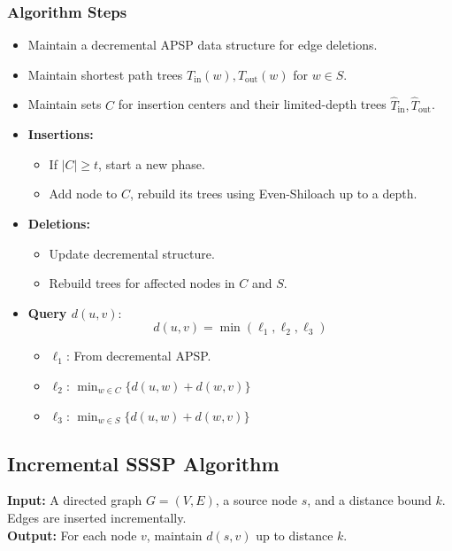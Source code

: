\documentclass[11pt]{article}
\begin{document}
\subsubsection*{Algorithm Steps}
\begin{itemize}
    \item Maintain a decremental APSP data structure for edge deletions.
    \item Maintain shortest path trees \( T_{\text{in}}(w), T_{\text{out}}(w) \) for \( w \in S \).
    \item Maintain sets \( C \) for insertion centers and their limited-depth trees \( \hat{T}_{\text{in}}, \hat{T}_{\text{out}} \).
    \item \textbf{Insertions:}
    \begin{itemize}
        \item If \( |C| \geq t \), start a new phase.
        \item Add node to \( C \), rebuild its trees using Even-Shiloach up to a depth.
    \end{itemize}
    \item \textbf{Deletions:}
    \begin{itemize}
        \item Update decremental structure.
        \item Rebuild trees for affected nodes in \( C \) and \( S \).
    \end{itemize}
    \item \textbf{Query \( d(u, v) \)}:
    \[
    d(u, v) = \min(\ell_1, \ell_2, \ell_3)
    \]
    \begin{itemize}
        \item \(\ell_1\): From decremental APSP.
        \item \(\ell_2\): \( \min_{w \in C} \{ d(u, w) + d(w, v) \} \)
        \item \(\ell_3\): \( \min_{w \in S} \{ d(u, w) + d(w, v) \} \)
    \end{itemize}
\end{itemize}

\subsection*{Incremental SSSP Algorithm}

\textbf{Input:} A directed graph \( G = (V, E) \), a source node \( s \), and a distance bound \( k \). Edges are inserted incrementally.\\
\textbf{Output:} For each node \( v \), maintain \( d(s, v) \) up to distance \( k \).
\end{document}

